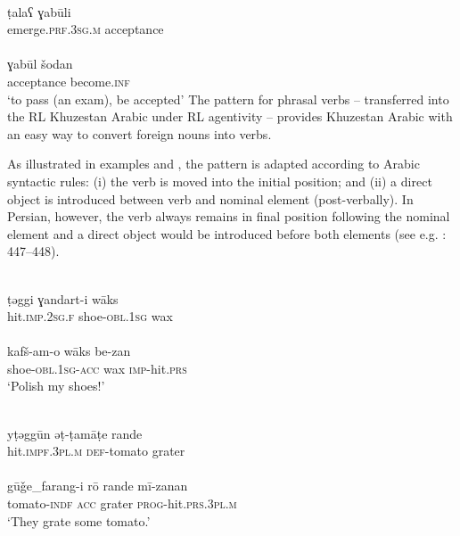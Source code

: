 \documentclass[output=paper,nonflat]{langsci/langscibook}
\begin{document}
\ea\label{ex:key:} \label{tala}
\\
\gll ṭalaʕ ɣabūli\footnotemark \\
     emerge.\textsc{prf}.3\textsc{sg}.\textsc{m} acceptance\\
\\
\gll ɣabūl šodan\\
     acceptance become.\textsc{inf} \\
\glt ‘to pass (an exam), be accepted’
\z\z
{}
The pattern for phrasal verbs – transferred into the RL Khuzestan Arabic under RL agentivity – provides Khuzestan Arabic with an easy way to convert foreign nouns into verbs.

As illustrated in examples  and , the pattern is adapted according to Arabic syntactic rules: (i) the verb is moved into the initial position; and (ii) a direct object is introduced between verb and nominal element (post-verbally). In Persian, however, the verb always remains in final position following the nominal element and a direct object would be introduced before both elements (see e.g. \citealt{Majidi1990}: 447–448).

\ea\label{ex:key:} \label{taggi}
\\
\gll ṭəggi ɣandart-i wāks\\
     hit.\textsc{imp.2sg.f} shoe-\textsc{obl}.1\textsc{sg} wax\\
 
\\
\gll kafš-am-o wāks be-zan\\
     shoe-\textsc{obl.}1\textsc{sg-acc} wax \textsc{imp-}hit\textsc{.prs}\\
\glt ‘Polish my shoes!’
\z\z

\ea\label{ex:key:} \label{tamate}
\\
\gll yṭəggūn əṭ-ṭamāṭe rande\\
     hit.\textsc{impf.3pl.m} \textsc{def}{}-tomato grater \\
 
\\
\gll gūǧe\_farang-i rō rande mī-zanan\\
     tomato-\textsc{indf} \textsc{acc} grater \textsc{prog}-hit\textsc{.prs.3pl.m} \\
\glt ‘They grate some tomato.’
\z\z
\end{document}
